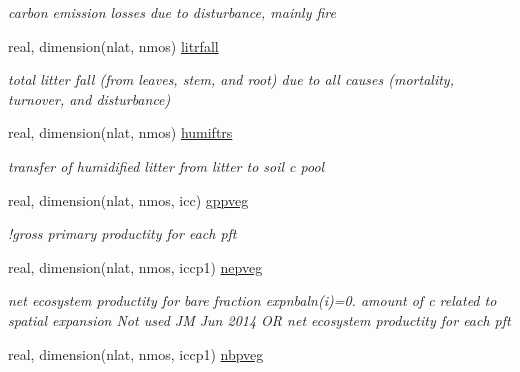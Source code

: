 \begin{DoxyCompactItemize}
\begin{DoxyCompactList}\small\item\em carbon emission losses due to disturbance, mainly fire \end{DoxyCompactList}\item 
\hypertarget{structctem__statevars_1_1veg__rot_a96619bdf1c5a1ecbdf7d22adcf38115f}{}real, dimension(nlat, nmos) \hyperlink{structctem__statevars_1_1veg__rot_a96619bdf1c5a1ecbdf7d22adcf38115f}{litrfall}\label{structctem__statevars_1_1veg__rot_a96619bdf1c5a1ecbdf7d22adcf38115f}

\begin{DoxyCompactList}\small\item\em total litter fall (from leaves, stem, and root) due to all causes (mortality, turnover, and disturbance) \end{DoxyCompactList}\item 
\hypertarget{structctem__statevars_1_1veg__rot_adb3abe4e09d70e283fe248b56eb1db6d}{}real, dimension(nlat, nmos) \hyperlink{structctem__statevars_1_1veg__rot_adb3abe4e09d70e283fe248b56eb1db6d}{humiftrs}\label{structctem__statevars_1_1veg__rot_adb3abe4e09d70e283fe248b56eb1db6d}

\begin{DoxyCompactList}\small\item\em transfer of humidified litter from litter to soil c pool \end{DoxyCompactList}\item 
\hypertarget{structctem__statevars_1_1veg__rot_a3eed6aeeece399d2477da3dd5b05119b}{}real, dimension(nlat, nmos, icc) \hyperlink{structctem__statevars_1_1veg__rot_a3eed6aeeece399d2477da3dd5b05119b}{gppveg}\label{structctem__statevars_1_1veg__rot_a3eed6aeeece399d2477da3dd5b05119b}

\begin{DoxyCompactList}\small\item\em !gross primary productity for each pft \end{DoxyCompactList}\item 
\hypertarget{structctem__statevars_1_1veg__rot_adca59caa4a750064c8dd49b7814f2c53}{}real, dimension(nlat, nmos, iccp1) \hyperlink{structctem__statevars_1_1veg__rot_adca59caa4a750064c8dd49b7814f2c53}{nepveg}\label{structctem__statevars_1_1veg__rot_adca59caa4a750064c8dd49b7814f2c53}

\begin{DoxyCompactList}\small\item\em net ecosystem productity for bare fraction expnbaln(i)=0. amount of c related to spatial expansion Not used J\+M Jun 2014 O\+R net ecosystem productity for each pft \end{DoxyCompactList}\item 
\hypertarget{structctem__statevars_1_1veg__rot_a50a88495dadd27ec7030c375b76a3873}{}real, dimension(nlat, nmos, iccp1) \hyperlink{structctem__statevars_1_1veg__rot_a50a88495dadd27ec7030c375b76a3873}{nbpveg}\label{structctem__statevars_1_1veg__rot_a50a88495dadd27ec7030c375b76a3873}


\end{DoxyCompactItemize}
